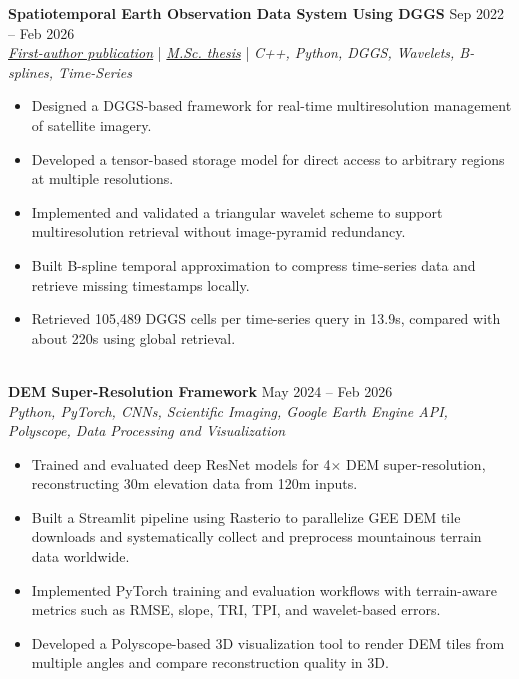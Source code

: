 \documentclass[a4paper,10pt]{article}
\begin{document}
\noindent
\textbf{Spatiotemporal Earth Observation Data System Using DGGS} \hfill Sep 2022 -- Feb 2026 \\
\textit{\href{https://doi.org/10.3390/rs17040570}{First-author publication}} | \textit{\href{https://ucalgary.scholaris.ca/items/114b394b-e516-4732-bd3a-45dd6160d480}{M.Sc. thesis}} | \textit{C++, Python, DGGS, Wavelets, B-splines, Time-Series}
\begin{itemize}[leftmargin=0.25in]
    \item Designed a DGGS-based framework for real-time multiresolution management of satellite imagery.
    \item Developed a tensor-based storage model for direct access to arbitrary regions at multiple resolutions.
    \item Implemented and validated a triangular wavelet scheme to support multiresolution retrieval without image-pyramid redundancy.
    \item Built B-spline temporal approximation to compress time-series data and retrieve missing timestamps locally.
    \item Retrieved 105,489 DGGS cells per time-series query in 13.9s, compared with about 220s using global retrieval.
\end{itemize}

\noindent \\
\textbf{DEM Super-Resolution Framework} \hfill May 2024 -- Feb 2026 \\
\textit{Python, PyTorch, CNNs, Scientific Imaging, Google Earth Engine API, Polyscope, Data Processing and Visualization}
\begin{itemize}[leftmargin=0.25in]
    \item Trained and evaluated deep ResNet models for 4$\times$ DEM super-resolution, reconstructing 30m elevation data from 120m inputs.
    \item Built a Streamlit pipeline using Rasterio to parallelize GEE DEM tile downloads and systematically collect and preprocess mountainous terrain data worldwide.
    \item Implemented PyTorch training and evaluation workflows with terrain-aware metrics such as RMSE, slope, TRI, TPI, and wavelet-based errors.
    \item Developed a Polyscope-based 3D visualization tool to render DEM tiles from multiple angles and compare reconstruction quality in 3D.
\end{itemize}
\end{document}
